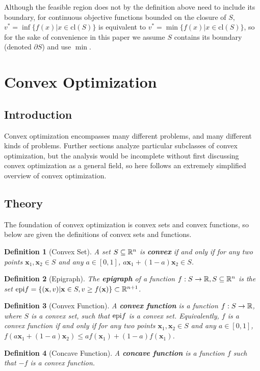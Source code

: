 \documentclass[10pt]{article}
\renewcommand{\vec}[1]{\mathbf{#1}}
\newcommand{\R}[1][]{ \ifx&#1& \mathbb{R} \else \mathbb{R}^{#1} \fi }
\newcommand{\epi}[2][]{\ifx&#1& \mathrm{epi}#2 \else \textrm{epi}_{#1}#2 \fi }
\newcommand{\affcomb}[3][a]{#1#2 + (1-#1)#3}
\newcommand{\x}{\vec{x}}
\newtheorem*{definition}{Definition}
\begin{document}
Although the feasible region does not by the definition above need to include its boundary, for continuous objective functions bounded on the closure of $S$, $v^*=\inf \{f(x)|x\in \textrm{cl}(S)\}$ is equivalent to $v^* = \min \{f(x)|x\in \textrm{cl}(S)\}$, so for the sake of convenience in this paper we assume $S$ contains its boundary (denoted $\partial S$) and use $\min$.

\section{Convex Optimization}
\subsection{Introduction}
Convex optimization encompasses many different problems, and many different kinds of problems. Further sections analyze particular subclasses of convex optimization, but the analysis would be incomplete without first discussing convex optimization as a general field, so here follows an extremely simplified overview of convex optimization.
\subsection{Theory}
The foundation of convex optimization is convex sets and convex functions, so below are given the definitions of convex sets and functions. 
\begin{definition}[Convex Set]
	A set $S\subseteq\R[n]$ is \textbf{convex} if and only if for any two points $\x_1, \x_2\in S$ and any $a\in[0,1]$, $\affcomb{\x_1}{\x_2}\in S$. \cite{boyd}
\end{definition}
\begin{definition}[Epigraph]
	The \textbf{epigraph} of a function $f:S\to\R, S\subseteq\R[n]$ is the set $\epi{f}=\{(\x,v)|\x\in S, v \geq f(\x)\}\subset\R[n+1]$. \cite{boyd}
\end{definition}
\begin{definition}[Convex Function]
	A \textbf{convex function} is a function $f:S\to\R$, where $S$ is a convex set, such that $\epi{f}$ is a convex set. Equivalently, $f$ is a convex function if and only if for any two points $\x_1,\x_2\in S$ and any $a\in[0,1]$, $f(\affcomb{\x_1}{\x_2})\leq\affcomb{f(\x_1)}{f(\x_1)}$.\cite{boyd}
\end{definition}
\begin{definition}[Concave Function]
	A \textbf{concave function} is a function $f$ such that $-f$ is a convex function.\cite{boyd}
\end{definition}
\end{document}
